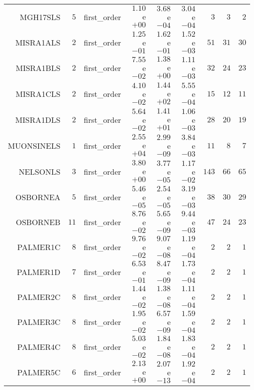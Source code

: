 \begin{longtable}{rrrrrrrrr}
MGH17SLS & \(     5\) & first\_order & \( 1.10\)e\(+00\) & \( 3.68\)e\(-04\) & \( 3.04\)e\(-04\) & \(     3\) & \(     3\) & \(     2\) \\
MISRA1ALS & \(     2\) & first\_order & \( 1.25\)e\(-01\) & \( 1.62\)e\(-01\) & \( 1.52\)e\(-03\) & \(    51\) & \(    31\) & \(    30\) \\
MISRA1BLS & \(     2\) & first\_order & \( 7.55\)e\(-02\) & \( 1.38\)e\(+00\) & \( 1.11\)e\(-03\) & \(    32\) & \(    24\) & \(    23\) \\
MISRA1CLS & \(     2\) & first\_order & \( 4.10\)e\(-02\) & \( 1.44\)e\(+02\) & \( 5.55\)e\(-04\) & \(    15\) & \(    12\) & \(    11\) \\
MISRA1DLS & \(     2\) & first\_order & \( 5.64\)e\(-02\) & \( 1.41\)e\(+01\) & \( 1.06\)e\(-03\) & \(    28\) & \(    20\) & \(    19\) \\
MUONSINELS & \(     1\) & first\_order & \( 2.55\)e\(+04\) & \( 2.99\)e\(-09\) & \( 3.84\)e\(-03\) & \(    11\) & \(     8\) & \(     7\) \\
NELSONLS & \(     3\) & first\_order & \( 3.80\)e\(+00\) & \( 3.77\)e\(-05\) & \( 1.17\)e\(-02\) & \(   143\) & \(    66\) & \(    65\) \\
OSBORNEA & \(     5\) & first\_order & \( 5.46\)e\(-05\) & \( 2.54\)e\(-05\) & \( 3.19\)e\(-03\) & \(    38\) & \(    30\) & \(    29\) \\
OSBORNEB & \(    11\) & first\_order & \( 8.76\)e\(-02\) & \( 5.65\)e\(-09\) & \( 9.44\)e\(-03\) & \(    47\) & \(    24\) & \(    23\) \\
PALMER1C & \(     8\) & first\_order & \( 9.76\)e\(-02\) & \( 9.07\)e\(-08\) & \( 1.19\)e\(-04\) & \(     2\) & \(     2\) & \(     1\) \\
PALMER1D & \(     7\) & first\_order & \( 6.53\)e\(-01\) & \( 8.47\)e\(-09\) & \( 1.73\)e\(-04\) & \(     2\) & \(     2\) & \(     1\) \\
PALMER2C & \(     8\) & first\_order & \( 1.44\)e\(-02\) & \( 1.38\)e\(-08\) & \( 1.11\)e\(-04\) & \(     2\) & \(     2\) & \(     1\) \\
PALMER3C & \(     8\) & first\_order & \( 1.95\)e\(-02\) & \( 6.57\)e\(-09\) & \( 1.59\)e\(-04\) & \(     2\) & \(     2\) & \(     1\) \\
PALMER4C & \(     8\) & first\_order & \( 5.03\)e\(-02\) & \( 1.84\)e\(-08\) & \( 1.83\)e\(-04\) & \(     2\) & \(     2\) & \(     1\) \\
PALMER5C & \(     6\) & first\_order & \( 2.13\)e\(+00\) & \( 2.07\)e\(-13\) & \( 1.92\)e\(-04\) & \(     2\) & \(     2\) & \(     1\) \\

\end{longtable}
